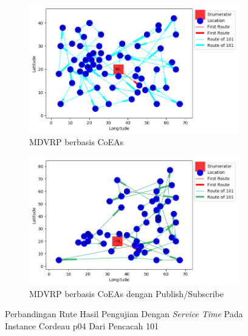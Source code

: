 \begin{figure}[H]
	\centering
	\begin{subfigure}[t]{\textwidth}
		\centering
		\includegraphics[width=\textwidth]{Resources/Images/cordeau_p04_tw/cordeau_p04_tw_101_coes}
		\caption{MDVRP berbasis CoEAs}
		\label{fig:cordeau_p04_tw_101_coes}
	\end{subfigure}
	\begin{subfigure}[t]{\textwidth}
		\centering
		\includegraphics[width=\textwidth]{Resources/Images/cordeau_p04_tw/cordeau_p04_tw_101_pubsub_coes}
		\caption{MDVRP berbasis CoEAs dengan Publish/Subscribe}
		\label{fig:cordeau_p04_tw_101_pubsub_coes}
	\end{subfigure}
	\caption{Perbandingan Rute Hasil Pengujian Dengan \textit{Service Time} Pada Instance Cordeau p04 Dari Pencacah 101}
	\label{fig:cordeau_p04_tw_101}
\end{figure}


